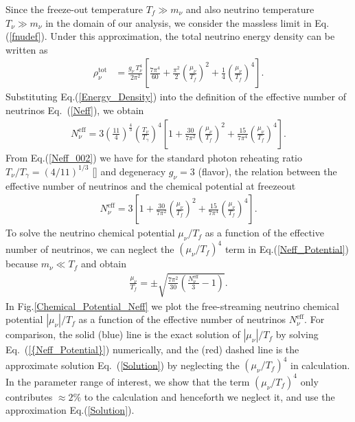 Since the freeze-out temperature $T_f\gg m_\nu$ and also neutrino temperature $T_\nu\gg m_\nu$ in the domain of our analysis, we consider the massless limit in Eq.\;(\ref{fnudef}). Under this approximation, the total neutrino energy density can be written as
\begin{align}
\label{Energy_Density}
\rho_\nu^{\mathrm{tot}}
&=\frac{g_\nu\,T_\nu^4}{2\pi^2}\left[\frac{7\pi^4}{60}+\frac{\pi^2}{2}\left(\frac{\mu_\nu}{T_f}\right)^{\!\!2}+\frac{1}{4}\left(\frac{\mu_\nu}{T_f}\right)^{\!\!4}\right].
\end{align}
Substituting Eq.\;(\ref{Energy_Density}) into the definition of the effective number of neutrinos Eq.~(\ref{Neff}), we obtain 
\begin{align}
\label{Neff_002}
N_\nu^{\mathrm{eff}}\!\!
=\!3\!\left(\frac{11}{4}\right)^{\!\!\frac{4}{3}}\!\!\left(\frac{T_\nu}{T_\gamma}\right)^{\!\!4}\!
\left[1\!+\!\frac{30}{7\pi^2}\!\!\left(\frac{\mu_\nu}{T_f}\right)^{\!\!2} 
\!\!+\frac{15}{7\pi^4}\!\!\left(\frac{\mu_\nu}{T_f}\right)^{\!\!4}\right].
\end{align}
From Eq.\;(\ref{Neff_002}) we have for the standard photon reheating ratio $T_\nu/T_\gamma=(4/11)^{1/3}$ [\cite{Kolb:1990vq}] and degeneracy $g_\nu=3$ (flavor), the relation between the effective number of neutrinos and the chemical potential at freezeout
\begin{align}
\label{Neff_Potential}
N_\nu^{\mathrm{eff}}=3\left[1+\frac{30}{7\pi^2}\left(\frac{\mu_\nu}{T_f}\right)^{\!\!2}+ \frac{15}{7\pi^4} \left(\frac{\mu_\nu}{T_f}\right)^{\!\!4}\right].
\end{align}
To solve the neutrino chemical potential $\mu_\nu/T_f$ as a function of the effective number of neutrinos, we can neglect the $(\mu_\nu/T_f)^4$ term in Eq.\;(\ref{Neff_Potential}) because $m_\nu\ll T_f$ and obtain
\begin{align}\label{Solution}
\frac{\mu_\nu}{T_f}=\pm\sqrt{\frac{7\pi^2}{30}\left(\frac{N_\nu^{\mathrm{eff}}}{3}-1\right)}.
\end{align}
In Fig.\;\ref{Chemical_Potential_Neff} we plot the free-streaming neutrino chemical potential $|\mu_\nu|/T_f$ as a function of the effective number of neutrinos $N_\nu^{\mathrm{eff}}$. For comparison, the solid (blue) line is the exact solution of $|\mu_\nu|/T_f$ by solving Eq.~(\ref{{Neff_Potential}}) numerically, and the (red) dashed line is the approximate solution Eq.~(\ref{Solution}) by neglecting the $(\mu_\nu/T_f)^4$ in calculation. In the parameter range of interest, we show that the term $(\mu_\nu/T_f)^4$ only contributes $\approx 2\%$ to the calculation and henceforth we neglect it, and use the approximation Eq.\;(\ref{Solution}). 

